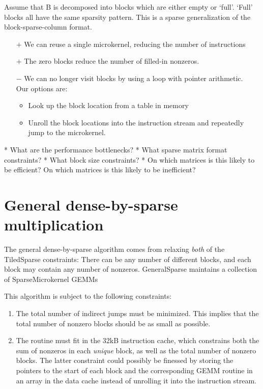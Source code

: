 {  Assume that B is decomposed into blocks which are either empty or `full'. `Full' blocks all have the same sparsity pattern. This is a sparse generalization of the block-sparse-column format.

  \begin{itemize}
  \item[$+$] We can reuse a single microkernel, reducing the number of instructions
  \item[$+$] The zero blocks reduce the number of filled-in nonzeros.
  \item[$-$] We can no longer visit blocks by using a loop with pointer arithmetic. \\Our options are:
    \begin{itemize}
    \item Look up the block location from a table in memory
    \item Unroll the block locations into the instruction stream and repeatedly jump to the microkernel.
    \end{itemize}
  \end{itemize}




* What are the performance bottlenecks?
* What sparse matrix format constraints?
* What block size constraints?
* On which matrices is this likely to be efficient? On which matrices is this likely to be inefficient?


\section{General dense-by-sparse multiplication}

The general dense-by-sparse algorithm comes from relaxing \emph{both} of the TiledSparse constraints: There can be any number of different blocks, and each block may contain any number of nonzeros. GeneralSparse maintains a collection of SparseMicrokernel GEMMs 

This algorithm is subject to the following constraints:

\begin{enumerate}

  \item The total number of indirect jumps must be minimized. This implies that the total number of nonzero blocks should be as small as possible. 

  \item The routine must fit in the 32kB instruction cache, which constrains both the sum of nonzeros in each \emph{unique} block, as well as the total number of nonzero blocks. The latter constraint could possibly be finessed by storing the pointers to the start of each block and the corresponding GEMM routine in an array in the data cache instead of unrolling it into the instruction stream.


\end{enumerate}}
